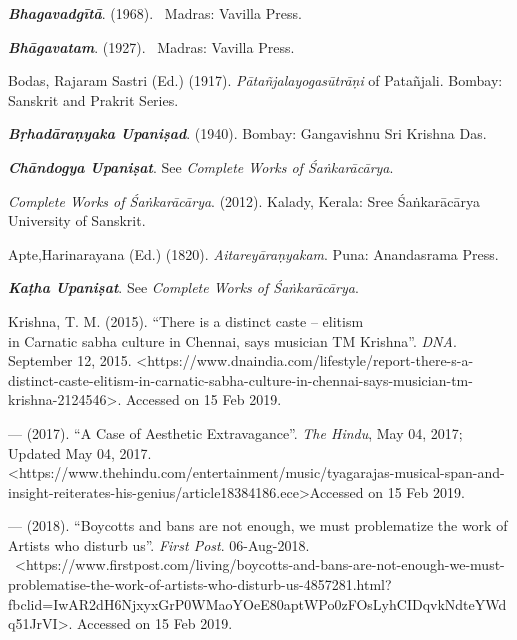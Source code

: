 \begin{thebibliography}{99}
\itemsep=1pt
 \textbf{\textit{Bhagavadgītā}}. (1968).  Madras: Vavilla Press.

  \textbf{\textit{Bhāgavatam}}. (1927).  Madras: Vavilla Press.

  Bodas, Rajaram Sastri (Ed.) (1917). \textit{Pātañjalayogasūtrāṇi} of Patañjali. Bombay: Sanskrit and Prakrit Series.

  \textbf{\textit{Bṛhadāraṇyaka Upaniṣad}}. (1940). Bombay: Gangavishnu Sri Krishna Das.

  \textbf{\textit{Chāndogya Upaniṣat}}. See \textit{Complete Works of Śaṅkarācārya}.

  \textit{Complete Works of Śaṅkarācārya}. (2012). Kalady, Kerala: Sree Śaṅkarācārya University of Sanskrit.

  Apte,Harinarayana (Ed.) (1820). \textit{Aitareyāraṇyakam}. Puna: Anandasrama Press.

  \textbf{\textit{Kaṭha Upaniṣat}}. See \textit{Complete Works of Śaṅkarācārya}.

  Krishna, T. M. (2015). “There is a distinct caste – elitism\\ in Carnatic sabha culture in Chennai, says musician TM Krishna”. \textit{DNA}. September 12, 2015. \textless  https://www.dnaindia.com/lifestyle/report-there-s-a-distinct-caste-elitism-in-carnatic-sabha-culture-in-chennai-says-musician-tm-krishna-2124546\textgreater . Accessed on 15 Feb 2019.

  — (2017). “A Case of Aesthetic Extravagance”. \textit{The Hindu}, May 04, 2017; Updated May 04, 2017. \textless https://www.thehindu.com/entertainment/\break music/tyagarajas-musical-span-and-insight-reiterates-his-genius/article18384186.ece\textgreater  Accessed on 15 Feb 2019.

  — (2018). “Boycotts and bans are not enough, we must problematize the work of Artists who disturb us”. \textit{First Post}. 06-Aug-2018.  \textless https://www.firstpost.com/living/boycotts-and-bans-are-not-enough-we-must-problematise-the-work-of-artists-who-disturb-us-4857281.html?fbclid=IwAR2dH6NjxyxGrP0WMaoYOeE80apt\break WPo0zFOsLyhCIDqvkNdteYWdq51JrVI\textgreater . Accessed on 15 Feb 2019.


\end{thebibliography}
